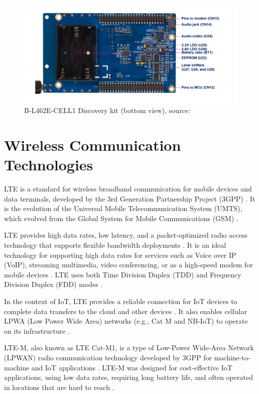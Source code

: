 \begin{figure}[H]
  \includegraphics[width=\linewidth]{B-L462E-CELL1_Back.png}
  \caption{B-L462E-CELL1 Discovery kit (bottom view), source: \cite{UM2743}}
  \label{fig:B-L462E-CELL1 Discovery kit (bottom view)}
\end{figure}

\section{Wireless Communication Technologies}
LTE is a standard for wireless broadband communication for mobile devices and data terminals, developed by the 3rd Generation Partnership Project (3GPP) \cite{TutorialspointLTE, ThalesgroupLTE}. It is the evolution of the Universal Mobile Telecommunication System (UMTS), which evolved from the Global System for Mobile Communications (GSM) \cite{TutorialspointLTE}.

LTE provides high data rates, low latency, and a packet-optimized radio access technology that supports flexible bandwidth deployments \cite{TutorialspointLTE}. It is an ideal technology for supporting high data rates for services such as Voice over IP (VoIP), streaming multimedia, video conferencing, or as a high-speed modem for mobile devices \cite{TutorialspointLTE}. LTE uses both Time Division Duplex (TDD) and Frequency Division Duplex (FDD) modes \cite{TutorialspointLTE}.

In the context of IoT, LTE provides a reliable connection for IoT devices to complete data transfers to the cloud and other devices \cite{TelitLTE}. It also enables cellular LPWA (Low Power Wide Area) networks (e.g., Cat M and NB-IoT) to operate on its infrastructure \cite{TelitLTE}.

LTE-M, also known as LTE Cat-M1, is a type of Low-Power Wide-Area Network (LPWAN) radio communication technology developed by 3GPP for machine-to-machine and IoT applications \cite{TelekomLTE}. LTE-M was designed for cost-effective IoT applications, using low data rates, requiring long battery life, and often operated in locations that are hard to reach \cite{TelenorLTE}.

